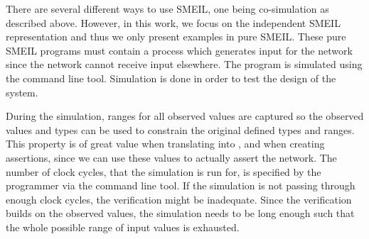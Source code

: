 There are several different ways to use SMEIL, one being co-simulation as described above. However, in this work, we focus on the independent SMEIL representation and thus we only present examples in pure SMEIL. These pure SMEIL programs must contain a process which generates input for the network since the network cannot receive input elsewhere. The program is simulated using the command line tool. Simulation is done in order to test the design of the system.

During the simulation, ranges for all observed values are captured so the observed values and types can be used to constrain the original defined types and ranges. This property is of great value when translating into \cspm{}, and when creating assertions, since we can use these values to actually assert the network.
The number of clock cycles, that the simulation is run for, is specified by the programmer via the command line tool. If the simulation is not passing through enough clock cycles, the verification might be inadequate. Since the verification builds on the observed values, the simulation needs to be long enough such that the whole possible range of input values is exhausted.




